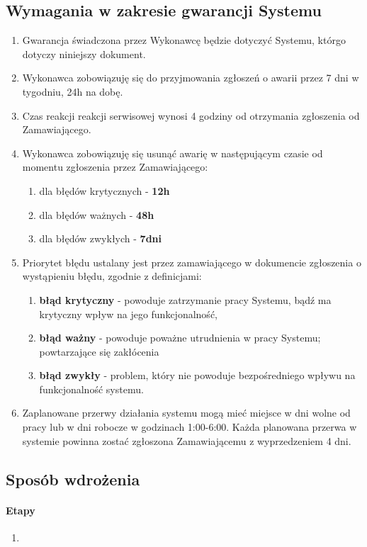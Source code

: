 \documentclass{article}
\begin{document}
\subsection{Wymagania w zakresie gwarancji Systemu}
\begin{enumerate}
	\item Gwarancja świadczona przez Wykonawcę będzie dotyczyć Systemu, którgo dotyczy niniejszy dokument.
	\item Wykonawca zobowiązuję się do przyjmowania zgłoszeń o awarii przez 7 dni w tygodniu, 24h na dobę.
	\item Czas reakcji reakcji serwisowej wynosi 4 godziny od otrzymania zgłoszenia od Zamawiającego.
	\item Wykonawca zobowiązuję się usunąć awarię w następującym czasie od momentu zgłoszenia przez Zamawiającego:
	\begin{enumerate}
		\item dla błędów krytycznych - \textbf{12h}
		\item dla błędów ważnych - \textbf{48h} 
		\item dla błędów zwykłych - \textbf{7dni}
	\end{enumerate}

	\item Priorytet błędu ustalany jest przez zamawiającego w dokumencie zgłoszenia o wystąpieniu błędu, zgodnie z definicjami:
	\begin{enumerate}
		\item \textbf{błąd krytyczny} - powoduje zatrzymanie pracy Systemu, bądź ma krytyczny wpływ na jego funkcjonalność,
		\item \textbf{błąd ważny} - powoduje poważne utrudnienia w pracy Systemu; powtarzające się zakłócenia
		\item \textbf{błąd zwykły} - problem, który nie powoduje bezpośredniego wpływu na funkcjonalność systemu.
	\end{enumerate}

	\item Zaplanowane przerwy działania systemu mogą mieć miejsce w dni wolne od pracy lub w dni robocze w godzinach 1:00-6:00. Każda planowana przerwa w systemie powinna zostać zgłoszona Zamawiającemu z wyprzedzeniem 4 dni.
	
\end{enumerate}
\subsection{Sposób wdrożenia}
\paragraph{Etapy}
\begin{enumerate}
\item 
\end{enumerate}
\end{document}
